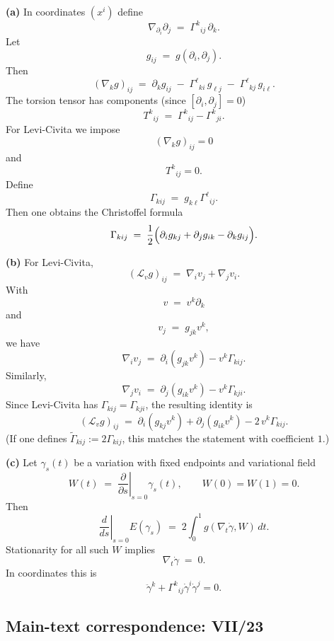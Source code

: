 \begin{solution}
\textbf{(a)}
In coordinates $(x^i)$ define
\[
\nabla_{\partial_i}\partial_j \;=\;\Gamma^k{}_{ij}\,\partial_k.
\]
Let
\[
g_{ij}\;=\;g(\partial_i,\partial_j).
\]
Then
\[
(\nabla_k g)_{ij}
\;=\;
\partial_k g_{ij}
\;-\;
\Gamma^\ell{}_{ki}\,g_{\ell j}
\;-\;
\Gamma^\ell{}_{kj}\,g_{i\ell}.
\]
The torsion tensor has components (since $[\partial_i,\partial_j]=0$)
\[
T^k{}_{ij}
\;=\;
\Gamma^k{}_{ij}-\Gamma^k{}_{ji}.
\]
For Levi-Civita we impose
\[
(\nabla_k g)_{ij}=0
\]
and
\[
T^k{}_{ij}=0.
\]
Define
\[
\Gamma_{kij}\;=\;g_{k\ell}\Gamma^\ell{}_{ij}.
\]
Then one obtains the Christoffel formula
\[
\Gamma_{kij}
\;=\;
\frac12\Bigl(\partial_i g_{kj}+\partial_j g_{ik}-\partial_k g_{ij}\Bigr).
\]

\textbf{(b)}
For Levi-Civita,
\[
(\mathcal{L}_v g)_{ij}
\;=\;
\nabla_i v_j+\nabla_j v_i.
\]
With
\[
v\;=\;v^k\partial_k
\]
and
\[
v_j\;=\;g_{jk}v^k,
\]
we have
\[
\nabla_i v_j
\;=\;
\partial_i(g_{jk}v^k)-v^k\Gamma_{kij}.
\]
Similarly,
\[
\nabla_j v_i
\;=\;
\partial_j(g_{ik}v^k)-v^k\Gamma_{kji}.
\]
Since Levi-Civita has $\Gamma_{kij}=\Gamma_{kji}$, the resulting identity is
\[
(\mathcal{L}_v g)_{ij}
\;=\;
\partial_i(g_{kj}v^k)+\partial_j(g_{ik}v^k)-2\,v^k\Gamma_{kij}.
\]
(If one defines $\widetilde\Gamma_{kij}:=2\Gamma_{kij}$, this matches the statement with coefficient $1$.)

\textbf{(c)}
Let $\gamma_s(t)$ be a variation with fixed endpoints and variational field
\[
W(t)\;=\;\left.\frac{\partial}{\partial s}\right|_{s=0}\gamma_s(t),
\qquad
W(0)=W(1)=0.
\]
Then
\[
\left.\frac{d}{ds}\right|_{s=0}E(\gamma_s)
\;=\;
2\int_0^1 g(\nabla_t\dot\gamma,W)\,dt.
\]
Stationarity for all such $W$ implies
\[
\nabla_t\dot\gamma\;=\;0.
\]
In coordinates this is
\[
\ddot\gamma^k+\Gamma^k{}_{ij}\dot\gamma^i\dot\gamma^j=0.
\]
\end{solution}

\subsection*{Main-text correspondence: VII/23}

